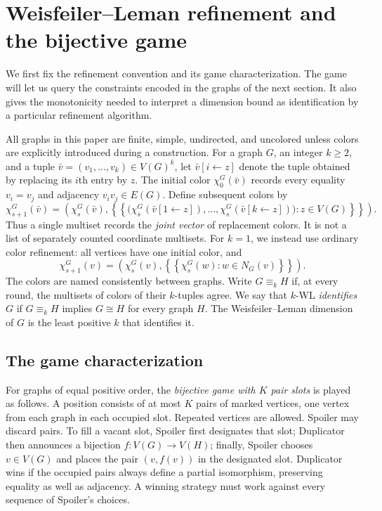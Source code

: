 \section{Weisfeiler--Leman refinement and the bijective game}
\label{sec:wl}

We first fix the refinement convention and its game characterization.
The game will let us query the constraints encoded in the graphs of the
next section. It also gives the monotonicity needed to interpret a
dimension bound as identification by a particular refinement algorithm.

All graphs in this paper are finite, simple, undirected, and uncolored
unless colors are explicitly introduced during a construction. For a
graph $G$, an integer $k\ge 2$, and a tuple
$\bar v=(v_1,\ldots,v_k)\in V(G)^k$, let
$\bar v[i\leftarrow z]$ denote the tuple obtained by replacing its
$i$th entry by $z$. The initial color $\chi_0^G(\bar v)$ records every
equality $v_i=v_j$ and adjacency $v_iv_j\in E(G)$. Define subsequent
colors by
\begin{equation}
\label{eq:wl-update}
\chi_{s+1}^G(\bar v)=
\left(\chi_s^G(\bar v),
\left\{\!\left\{
  \bigl(\chi_s^G(\bar v[1\leftarrow z]),\ldots,
        \chi_s^G(\bar v[k\leftarrow z])\bigr)
       :z\in V(G)
\right\}\!\right\}\right).
\end{equation}
Thus a single multiset records the \emph{joint vector} of replacement
colors. It is not a list of separately counted coordinate multisets.
For $k=1$, we instead use ordinary color refinement: all vertices have
one initial color, and
\[
\chi_{s+1}^G(v)=
\left(\chi_s^G(v),
\left\{\!\left\{\chi_s^G(w):w\in N_G(v)\right\}\!\right\}\right).
\]
The colors are named consistently between graphs. Write $G\equiv_k H$
if, at every round, the multisets of colors of their $k$-tuples agree.
We say that $k$-WL \emph{identifies} $G$ if $G\equiv_k H$ implies
$G\cong H$ for every graph $H$. The Weisfeiler--Leman dimension of $G$
is the least positive $k$ that identifies it.

\subsection{The game characterization}

For graphs of equal positive order, the \emph{bijective game with $K$
pair slots} is played as follows. A position consists of at most $K$
pairs of marked vertices, one vertex from each graph in each occupied
slot. Repeated vertices are allowed. Spoiler may discard pairs. To
fill a vacant slot, Spoiler first designates that slot; Duplicator
then announces a bijection $f:V(G)\to V(H)$; finally, Spoiler chooses
$v\in V(G)$ and places the pair $(v,f(v))$ in the designated slot.
Duplicator wins if the occupied pairs always define a partial
isomorphism, preserving equality as well as adjacency. A winning
strategy must work against every sequence of Spoiler's choices.

